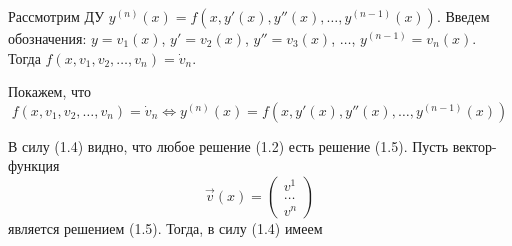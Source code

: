     Рассмотрим ДУ $y^{(n)}(x) = f(x, y'(x), y''(x), \dots, y^{(n-1)}(x))$. Введем обозначения: $y = v_1(x)$, $y' = v_2(x)$,
    $y'' = v_3(x)$, $\dots$, $y^{(n - 1)} = v_n(x)$. Тогда $f(x, v_1, v_2, \dots, v_n) = \dot v_n$.
    
    Покажем, что
    \begin{equation*}
        f(x, v_1, v_2, \dots, v_n) = \dot v_n \Leftrightarrow y^{(n)}(x) = f(x, y'(x), y''(x), \dots, y^{(n-1)}(x))
    \end{equation*}

    В силу (1.4) видно, что любое решение (1.2) есть решение (1.5).
    Пусть вектор-функция
    \begin{equation*}
        \vec{v}(x) = 
        \begin{pmatrix}
            v^1 \\
            \dots \\
            v^n
        \end{pmatrix}
    \end{equation*}
    является решением (1.5). Тогда, в силу (1.4) имеем 
    
